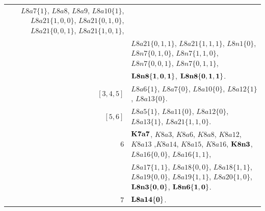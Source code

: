 \documentclass[pdftex, a4paper, 12pt, oneside]{amsart}
\numberwithin{equation}{section}
\theoremstyle{plain}
\theoremstyle{definition}
\begin{document}
\begin{footnotesize}
\begin{center}
\begin{longtable}[ht]{r||l}
			$L8a7\{1\}$, $L8a8$, $L8a9$, $L8a10\{1\}$,
			$L8a21\{1,0,0\}$, $L8a21\{0,1,0\}$, $L8a21\{0,0,1\}$, $L8a21\{1,0,1\}$,  
			\\
			&
			$L8a21\{0,1,1\}$, $L8a21\{1,1,1\}$, $L8n1\{0\}$, $L8n7\{0,1,0\}$, $L8n7\{1,1,0\}$, $L8n7\{0,0,1\}$, $L8n7\{0,1,1\}$, 
			\\
			&
			$\bf  L8n8\{1,0,1\}$, $\bf L8n8\{0,1,1\}$.
			\\
			\hline
			$[3, 4, 5]$& $L8a6\{1\}$,  $L8a7\{0\}$, $L8a10\{0\}$, $L8a12\{1\}$, $L8a13\{0\}$.
			\\
			\hline
			$[5, 6]$& $L8a5\{1\}$, $L8a11\{0\}$, $L8a12\{0\}$, $L8a13\{1\}$, $L8a21\{1,1,0\}$.
			\\
			\hline
			$6$&$\bf K7a7$, $K8a3$, $K8a6$, $K8a8$,  $K8a12$, $K8a13$ ,$K8a14$, $K8a15$, $K8a16$, $\bf K8n3$, $L8a16\{0,0\}$, $L8a16\{1,1\}$,
			\\
			&
			$L8a17\{1,1\}$, $L8a18\{0,0\}$, $L8a18\{1,1\}$, $L8a19\{0,0\}$, $L8a19\{1,1\}$, $L8a20\{1,0\}$, $\bf L8n3\{0,0\}$,  
			$\bf L8n6\{1,0\}$.
			\\
			\hline
			$7$&$\bf L8a14\{0\}$.
			\\
			\hline
		\end{longtable}
	\end{center}
	
\end{footnotesize}
	
	
	
\end{document}
